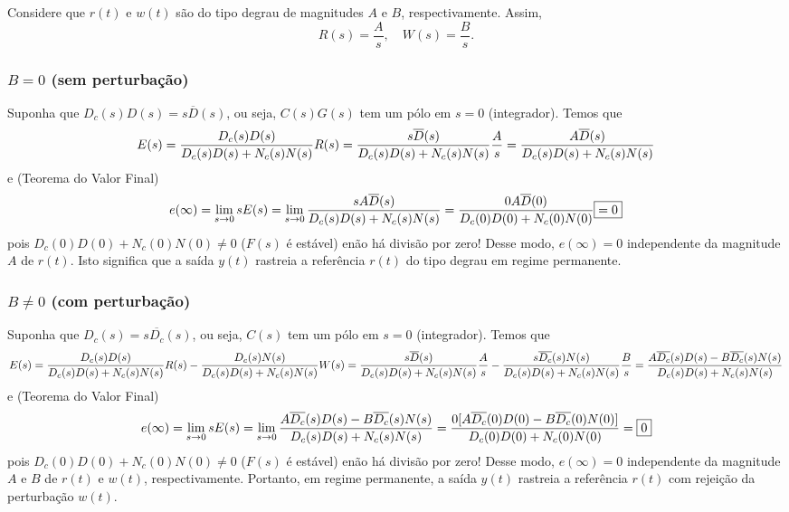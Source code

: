 \documentclass[
]{book}
\begin{document}
Considere que \(r(t)\) e \(w(t)\) são do tipo degrau de magnitudes \(A\) e \(B\), respectivamente. Assim,
\[
R(s) = \frac{A}{s}, \quad W(s) = \frac{B}{s}.
\]

\hypertarget{b0-sem-perturbauxe7uxe3o}{%
\subsubsection*{\texorpdfstring{\textbf{\(B=0\) (sem perturbação)}}{B=0 (sem perturbação)}}\label{b0-sem-perturbauxe7uxe3o}}

Suponha que \(D_c(s)D(s) = s\overline{D}(s)\), ou seja, \(C(s)G(s)\) tem um pólo em \(s=0\) (integrador). Temos que
\[
E(s) = \frac{D_c(s)D(s)}{D_c(s)D(s)+N_c(s)N(s)}R(s) = \frac{s\overline{D}(s)}{D_c(s)D(s)+N_c(s)N(s)}\frac{A}{s}\\
= \frac{A\overline{D}(s)}{D_c(s)D(s)+N_c(s)N(s)}
\]
e (Teorema do Valor Final)
\[
e(\infty) = \lim\limits_{s\to0}{sE(s)} =
\lim\limits_{s\to0}{\frac{sA\overline{D}(s)}{D_c(s)D(s)+N_c(s)N(s)}} = \frac{0A\overline{D}(0)}{D_c(0)D(0)+N_c(0)N(0)} \\
\boxed{=0}
\]
pois \(D_c(0)D(0) + N_c(0)N(0) \neq 0\) (\(F(s)\) é estável) enão há divisão por zero! Desse modo, \(e(\infty) = 0\) independente da magnitude \(A\) de \(r(t)\). Isto significa que a saída \(y(t)\) rastreia a referência \(r(t)\) do tipo degrau em regime permanente.

\hypertarget{bneq0-com-perturbauxe7uxe3o}{%
\subsubsection*{\texorpdfstring{\textbf{\(B\neq0\) (com perturbação)}}{B\textbackslash neq0 (com perturbação)}}\label{bneq0-com-perturbauxe7uxe3o}}

Suponha que \(D_c(s) = s\overline{D_c}(s)\), ou seja, \(C(s)\) tem um pólo em \(s=0\) (integrador). Temos que
\[
E(s) = \frac{D_c(s)D(s)}{D_c(s)D(s)+N_c(s)N(s)}R(s)-\frac{D_c(s)N(s)}{D_c(s)D(s)+N_c(s)N(s)}W(s) \\
= \frac{s\overline{D}(s)}{D_c(s)D(s)+N_c(s)N(s)}\frac{A}{s} - \frac{s\overline{D_c}(s)N(s)}{D_c(s)D(s)+N_c(s)N(s)}\frac{B}{s}\\
= \frac{A\overline{D_c}(s)D(s) - B\overline{D_c}(s)N(s)}{D_c(s)D(s)+N_c(s)N(s)}
\]
e (Teorema do Valor Final)
\[
e(\infty) = \lim\limits_{s\to0}{sE(s)} =
\lim\limits_{s\to0}{\frac{A\overline{D_c}(s)D(s) - B\overline{D_c}(s)N(s)}{D_c(s)D(s)+N_c(s)N(s)}} \\
= \frac{0[A\overline{D_c}(0)D(0) - B\overline{D_c}(0)N(0)]}{D_c(0)D(0)+N_c(0)N(0)} =
\boxed{0}
\]
pois \(D_c(0)D(0) + N_c(0)N(0) \neq 0\) (\(F(s)\) é estável) enão há divisão por zero! Desse modo, \(e(\infty) = 0\) independente da magnitude \(A\) e \(B\) de \(r(t)\) e \(w(t)\), respectivamente. Portanto, em regime permanente, a saída \(y(t)\) rastreia a referência \(r(t)\) com rejeição da perturbação \(w(t)\).
\end{document}
